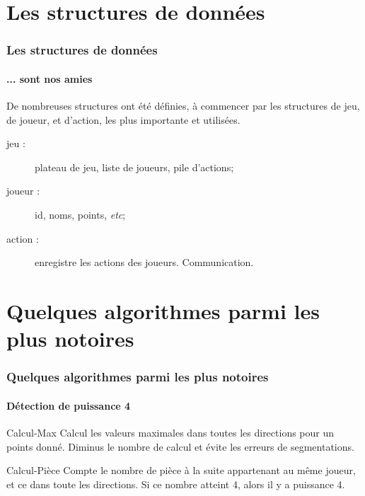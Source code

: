 \documentclass{beamer}
\begin{document}
    \section{Les structures de données}
    \begin{frame}
    \frametitle{Les structures de données}
    \framesubtitle{... sont nos amies}
        De nombreuses structures ont été définies, à commencer 
            par les structures de jeu, de joueur, et d'action, 
            les plus importante et utilisées.\\
        \begin{description}
            \item[jeu :] plateau de jeu, liste de joueurs, pile d'actions;\\
            \item[joueur :] id, noms, points, \textit{etc};\\
            \item[action :] enregistre les actions des joueurs. Communication.\\
        \end{description}
    \end{frame}




    \section{Quelques algorithmes parmi les plus notoires}
    \begin{frame}
    \frametitle{Quelques algorithmes parmi les plus notoires}
    \framesubtitle{Détection de puissance 4}
    	\begin{block}{Calcul-Max}
		    Calcul les valeurs maximales dans toutes les directions pour un points donné. Diminus le nombre de calcul et évite les erreurs de segmentations.\\
	\end{block}
	\begin{block}{Calcul-Pièce}
		    Compte le nombre de pièce à la suite appartenant au même joueur, et ce dans toute les directions. Si ce nombre atteint 4, alors il y a puissance 4.\\
	\end{block}
    \end{frame}





\end{document}

